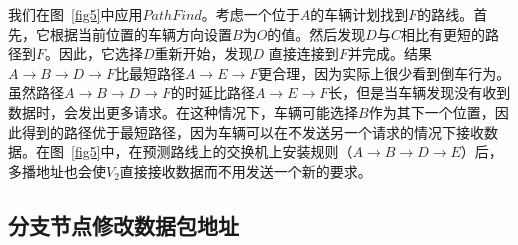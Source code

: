 
我们在图~\ref{fig5}中应用$PathFind$。考虑一个位于$A$的车辆计划找到$F$的路线。首先，它根据当前位置的车辆方向设置$B$为$O$的值。然后发现$D$与$C$相比有更短的路径到$F$。因此，它选择$D$重新开始，发现$D$
直接连接到$F$并完成。结果$ A \to B \to D \to F $比最短路径$ A \to E \to F $更合理，因为实际上很少看到倒车行为。虽然路径$ A \to B \to D \to F $的时延比路径$ A \to E \to F $长，但是当车辆发现没有收到数据时，会发出更多请求。在这种情况下，车辆可能选择$B$作为其下一个位置，因此得到的路径优于最短路径，因为车辆可以在不发送另一个请求的情况下接收数据。在图~\ref{fig5}中，在预测路线上的交换机上安装规则（$ A \to B \to D \to E $）后，多播地址也会使$V_{2}$直接接收数据而不用发送一个新的要求。
%
%



\subsection{分支节点修改数据包地址} \label{Modify address}

